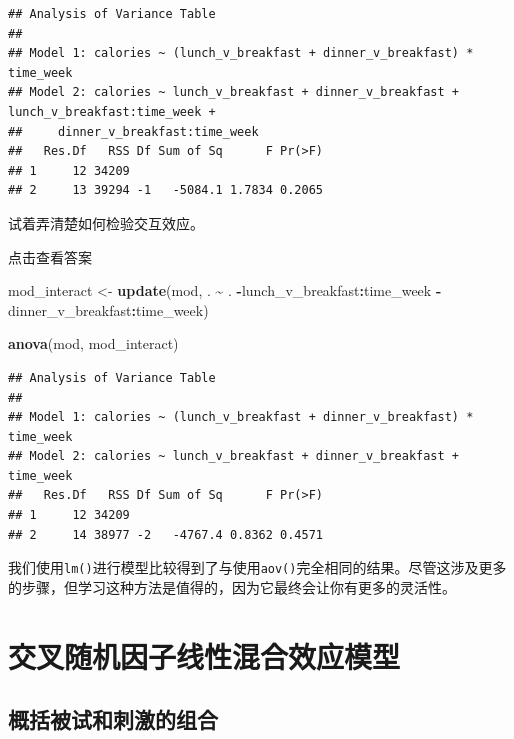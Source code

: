 \documentclass[
]{book}
\newenvironment{Shaded}{\begin{snugshade}}{\end{snugshade}}
\newcommand{\FunctionTok}[1]{\textcolor[rgb]{0.13,0.29,0.53}{\textbf{#1}}}
\newcommand{\NormalTok}[1]{#1}
\newcommand{\OtherTok}[1]{\textcolor[rgb]{0.56,0.35,0.01}{#1}}
\newcommand{\SpecialCharTok}[1]{\textcolor[rgb]{0.81,0.36,0.00}{\textbf{#1}}}
\begin{document}
\begin{verbatim}
## Analysis of Variance Table
## 
## Model 1: calories ~ (lunch_v_breakfast + dinner_v_breakfast) * time_week
## Model 2: calories ~ lunch_v_breakfast + dinner_v_breakfast + lunch_v_breakfast:time_week + 
##     dinner_v_breakfast:time_week
##   Res.Df   RSS Df Sum of Sq      F Pr(>F)
## 1     12 34209                           
## 2     13 39294 -1   -5084.1 1.7834 0.2065
\end{verbatim}

试着弄清楚如何检验交互效应。

点击查看答案

\begin{Shaded}
\begin{Highlighting}[]
\NormalTok{mod\_interact }\OtherTok{\textless{}{-}} \FunctionTok{update}\NormalTok{(mod, . }\SpecialCharTok{\textasciitilde{}}\NormalTok{ . }\SpecialCharTok{{-}}\NormalTok{lunch\_v\_breakfast}\SpecialCharTok{:}\NormalTok{time\_week}
                       \SpecialCharTok{{-}}\NormalTok{dinner\_v\_breakfast}\SpecialCharTok{:}\NormalTok{time\_week)}

\FunctionTok{anova}\NormalTok{(mod, mod\_interact)}
\end{Highlighting}
\end{Shaded}

\begin{verbatim}
## Analysis of Variance Table
## 
## Model 1: calories ~ (lunch_v_breakfast + dinner_v_breakfast) * time_week
## Model 2: calories ~ lunch_v_breakfast + dinner_v_breakfast + time_week
##   Res.Df   RSS Df Sum of Sq      F Pr(>F)
## 1     12 34209                           
## 2     14 38977 -2   -4767.4 0.8362 0.4571
\end{verbatim}

我们使用\texttt{lm()}进行模型比较得到了与使用\texttt{aov()}完全相同的结果。尽管这涉及更多的步骤，但学习这种方法是值得的，因为它最终会让你有更多的灵活性。

\hypertarget{ux4ea4ux53c9ux968fux673aux56e0ux5b50ux7ebfux6027ux6df7ux5408ux6548ux5e94ux6a21ux578b}{%
\chapter{交叉随机因子线性混合效应模型}\label{ux4ea4ux53c9ux968fux673aux56e0ux5b50ux7ebfux6027ux6df7ux5408ux6548ux5e94ux6a21ux578b}}

\hypertarget{ux6982ux62ecux88abux8bd5ux548cux523aux6fc0ux7684ux7ec4ux5408}{%
\section{概括被试和刺激的组合}\label{ux6982ux62ecux88abux8bd5ux548cux523aux6fc0ux7684ux7ec4ux5408}}
\end{document}
